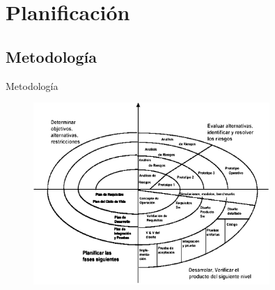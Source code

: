 \documentclass[spanish,xcolor=table,svgnames]{beamer}
\begin{document}
\section{Planificación}

\subsection*{Metodología}
\begin{frame}{Metodología}
    \begin{center}
    \begin{figure}[H]
      \begin{center}
          \includegraphics[width=0.8\textwidth]{img/espiral.png}
      \end{center}
      \label{fig:espiral}
    \end{figure}
  \end{center}
\end{frame}
\end{document}
